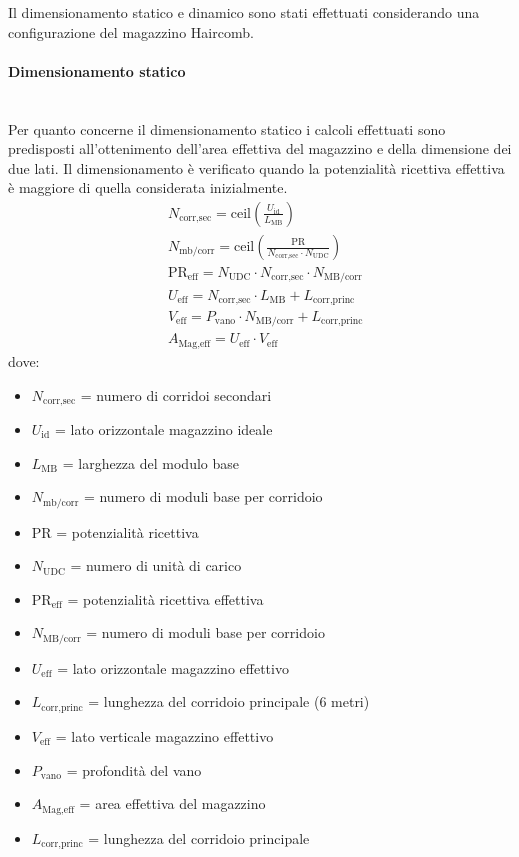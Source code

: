 \documentclass[11pt]{article}
\begin{document}
\noindent
Il dimensionamento statico e dinamico sono stati effettuati considerando una configurazione del magazzino Haircomb.
\newpage

\paragraph{Dimensionamento statico}\mbox{}\\
Per quanto concerne il dimensionamento statico i calcoli effettuati sono predisposti all'ottenimento dell'area effettiva del magazzino e della dimensione dei due lati. Il dimensionamento è verificato quando la potenzialità ricettiva effettiva è maggiore di quella considerata inizialmente.
\begin{align}
    & N_\text{corr,sec} = \text{ceil}\left(\frac{U_\text{id}}{L_\text{MB}}\right) \\
    & N_\text{mb/corr} = \text{ceil}\left(\frac{\text{PR}}{N_\text{corr,sec} \cdot N_\text{UDC}}\right) \\
    & \text{PR}_\text{eff} = N_\text{UDC} \cdot N_\text{corr,sec} \cdot N_\text{MB/corr} \\
    & U_\text{eff} = N_\text{corr,sec} \cdot L_\text{MB} + L_\text{corr,princ} \\
    & V_\text{eff} = P_\text{vano} \cdot N_\text{MB/corr} + L_\text{corr,princ} \\
    & A_\text{Mag,eff} = U_\text{eff} \cdot V_\text{eff}
\end{align}
dove:
\begin{itemize}
    \item $N_\text{corr,sec}$ = numero di corridoi secondari
    \item $U_\text{id}$ = lato orizzontale magazzino ideale
    \item $L_\text{MB}$ = larghezza del modulo base
    \item $N_\text{mb/corr}$ = numero di moduli base per corridoio
    \item $\text{PR}$ = potenzialità ricettiva
    \item $N_\text{UDC}$ = numero di unità di carico
    \item $\text{PR}_\text{eff}$ = potenzialità ricettiva effettiva
    \item $N_\text{MB/corr}$ = numero di moduli base per corridoio
    \item $U_\text{eff}$ = lato orizzontale magazzino effettivo
    \item $L_\text{corr,princ}$ = lunghezza del corridoio principale (6 metri)
    \item $V_\text{eff}$ = lato verticale magazzino effettivo
    \item $P_\text{vano}$ = profondità del vano
    \item $A_\text{Mag,eff}$ = area effettiva del magazzino
    \item $L_\text{corr,princ}$ = lunghezza del corridoio principale
\end{itemize}
\newpage
\end{document}
